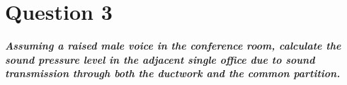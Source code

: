 \section{Question 3}

\textbf{\textit{Assuming a raised male voice in the conference room, calculate the sound pressure level in the adjacent single office due to sound transmission through both the ductwork and the common partition.}}


